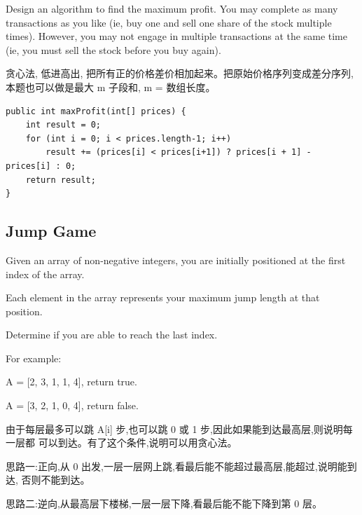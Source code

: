 \documentclass[12pt]{book}
\begin{document}
Design an algorithm to find the maximum profit. You may complete as many transactions as you like (ie, buy one and sell one share of the stock multiple times). However, you may not engage in multiple transactions at the same time (ie, you must sell the stock before you buy again).

贪心法, 低进高出, 把所有正的价格差价相加起来。把原始价格序列变成差分序列, 本题也可以做是最大 m 子段和, m = 数组长度。

\lstset{language=java,label= ,caption= ,numbers=none}
\begin{lstlisting}
public int maxProfit(int[] prices) {
    int result = 0;
    for (int i = 0; i < prices.length-1; i++) 
        result += (prices[i] < prices[i+1]) ? prices[i + 1] - prices[i] : 0;
    return result;
}
\end{lstlisting}

\subsection{Jump Game}
\label{sec-13-1-4}
Given an array of non-negative integers, you are initially positioned at the first index of the array.

Each element in the array represents your maximum jump length at that position.

Determine if you are able to reach the last index.

For example:

A = [2, 3, 1, 1, 4], return true.

A = [3, 2, 1, 0, 4], return false.

由于每层最多可以跳 A[i] 步,也可以跳 0 或 1 步,因此如果能到达最高层,则说明每一层都
可以到达。有了这个条件,说明可以用贪心法。

思路一:正向,从 0 出发,一层一层网上跳,看最后能不能超过最高层,能超过,说明能到达,
否则不能到达。

思路二:逆向,从最高层下楼梯,一层一层下降,看最后能不能下降到第 0 层。
\end{document}
